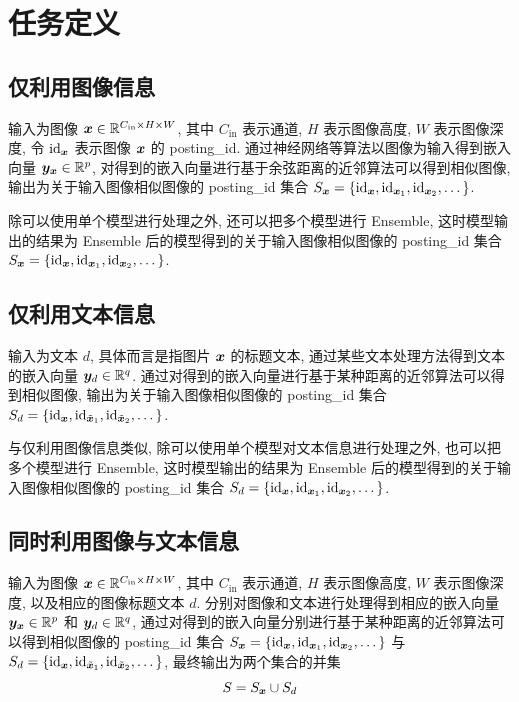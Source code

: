 \documentclass[12pt]{article}
\begin{document}
\section{任务定义}

\subsection{仅利用图像信息}

输入为图像 $\bm{x}\in\mathbb{R}^{C_{\text{in}}\times H\times W}$, 其中 $C_{\text{in}}$ 表示通道, $H$ 表示图像高度, $W$ 表示图像深度, 令 $\text{id}_{\bm{x}}$ 表示图像 $\bm{x}$ 的 posting\_id. 通过神经网络等算法以图像为输入得到嵌入向量 $\bm{y}_{\bm{x}}\in\mathbb{R}^{p}$, 对得到的嵌入向量进行基于余弦距离的近邻算法可以得到相似图像, 输出为关于输入图像相似图像的 posting\_id 集合 $S_{\bm{x}}=\{\operatorname{id}_{\bm{x}},\operatorname{id}_{\bm{x}_1},\operatorname{id}_{\bm{x}_2},\dots\}$.

除可以使用单个模型进行处理之外, 还可以把多个模型进行 Ensemble, 这时模型输出的结果为 Ensemble 后的模型得到的关于输入图像相似图像的 posting\_id 集合 $S_{\bm{x}}=\{\operatorname{id}_{\bm{x}},\operatorname{id}_{\bm{x}_1},\operatorname{id}_{\bm{x}_2},\dots\}$.

\subsection{仅利用文本信息}

输入为文本 $d$, 具体而言是指图片 $\bm{x}$ 的标题文本, 通过某些文本处理方法得到文本的嵌入向量 $\bm{y}_d\in\mathbb{R}^{q}$. 通过对得到的嵌入向量进行基于某种距离的近邻算法可以得到相似图像, 输出为关于输入图像相似图像的 posting\_id 集合 $S_{d}=\{\operatorname{id}_{\bm{x}},\operatorname{id}_{\tilde{\bm{x}}_1},\operatorname{id}_{\tilde{\bm{x}}_2},\dots\}$. 

与仅利用图像信息类似, 除可以使用单个模型对文本信息进行处理之外, 也可以把多个模型进行 Ensemble, 这时模型输出的结果为 Ensemble 后的模型得到的关于输入图像相似图像的 posting\_id 集合 $S_d=\{\operatorname{id}_{\bm{x}},\operatorname{id}_{\bm{x}_1},\operatorname{id}_{\bm{x}_2},\dots\}$.

\subsection{同时利用图像与文本信息}

输入为图像 $\bm{x}\in\mathbb{R}^{C_{\text{in}}\times H\times W}$, 其中 $C_{\text{in}}$ 表示通道, $H$ 表示图像高度, $W$ 表示图像深度, 以及相应的图像标题文本 $d$. 分别对图像和文本进行处理得到相应的嵌入向量 $\bm{y}_{\bm{x}}\in\mathbb{R}^{p}$ 和 $\bm{y}_{d}\in\mathbb{R}^{q}$, 通过对得到的嵌入向量分别进行基于某种距离的近邻算法可以得到相似图像的 posting\_id 集合 $S_{\bm{x}}=\{\operatorname{id}_{\bm{x}},\operatorname{id}_{\bm{x}_1},\operatorname{id}_{\bm{x}_2},\dots\}$ 与 $S_{d}=\{\operatorname{id}_{\bm{x}},\operatorname{id}_{\tilde{\bm{x}}_1},\operatorname{id}_{\tilde{\bm{x}}_2},\dots\}$, 最终输出为两个集合的并集
\begin{equation}
  S = S_{\bm{x}}\cup S_{d}
\end{equation}
\end{document}
